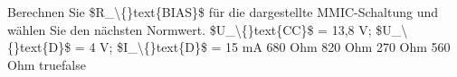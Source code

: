     {Berechnen Sie \$R\_\textbackslash\{\}text\{BIAS\}\$ für die dargestellte MMIC-Schaltung und wählen Sie den nächsten Normwert. \$U\_\textbackslash\{\}text\{CC\}\$ = 13,8 V; \$U\_\textbackslash\{\}text\{D\}\$ = 4 V; \$I\_\textbackslash\{\}text\{D\}\$ = 15 mA}
    {680 Ohm}
    {820 Ohm}
    {270 Ohm}
    {560 Ohm}
    {true}{false}